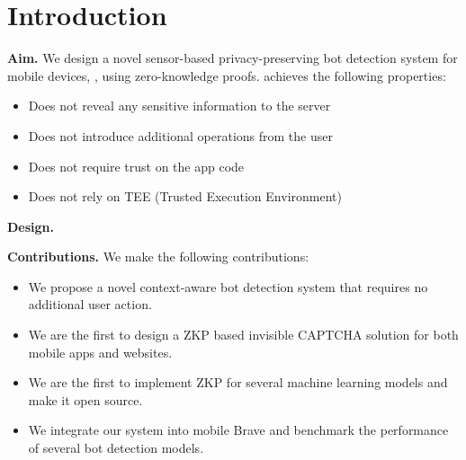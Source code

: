 \section{Introduction}

{\bf Aim.} 
We design a novel sensor-based privacy-preserving bot detection system for mobile devices, \name, using zero-knowledge proofs. \name achieves the following properties:

\begin{itemize}
    \item Does not reveal any sensitive information to the server
    \item Does not introduce additional operations from the user
    \item Does not require trust on the app code
    \item Does not rely on TEE (Trusted Execution Environment)
\end{itemize}

{\bf Design.}


{\bf Contributions.}
We make the following contributions:

\begin{itemize}
    \item We propose a novel context-aware bot detection system that requires no additional user action.
    \item We are the first to design a ZKP based invisible CAPTCHA solution for both mobile apps and websites.
    \item We are the first to implement ZKP for several machine learning models and make it open source.
    \item We integrate our system into mobile Brave and benchmark the performance of several bot detection models.
\end{itemize}




 










